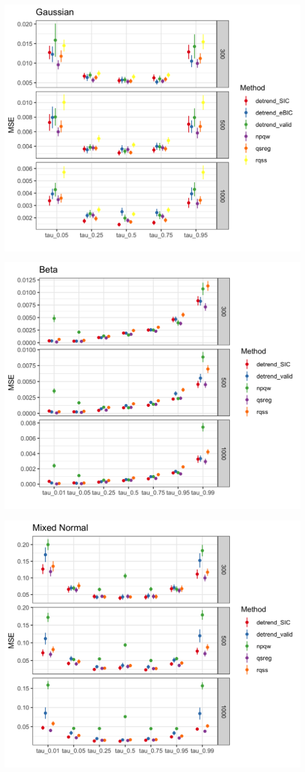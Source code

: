 \documentclass[]{article}
\begin{document}
\includegraphics[width=\linewidth]{Figures/gaus_mse.png}	

\includegraphics[width=\linewidth]{Figures/shapebeta_mse.png}

\includegraphics[width=\linewidth]{Figures/mixednorm_mse.png}
\end{document}
